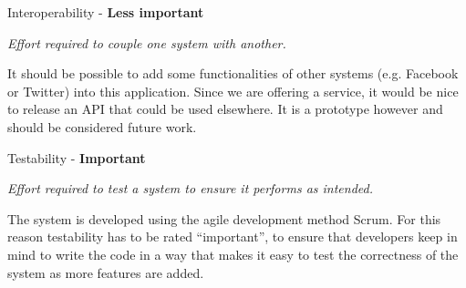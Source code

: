 \vspace{5 mm}
\noindent
Interoperability - \textbf{Less important}

\vspace{5 mm}
\noindent
\textit{Effort required to couple one system with another.}

\vspace{5 mm}
\noindent
It should be possible to add some functionalities of other systems (e.g. Facebook or
Twitter) into this application. Since we are offering a service, it would be
nice to release an API that could be used elsewhere. It is a prototype however
and should be considered future work.

\vspace{5 mm}
\noindent
Testability - \textbf{Important}

\vspace{5 mm}
\noindent
\textit{Effort required to test a system to ensure it performs as intended.}

\vspace{5 mm}
\noindent
The system is developed using the agile development method Scrum. For this
reason testability has to be rated ``important'', to ensure that developers keep in mind to write the
code in a way that makes it easy to test the correctness of the system as more
features are added.
